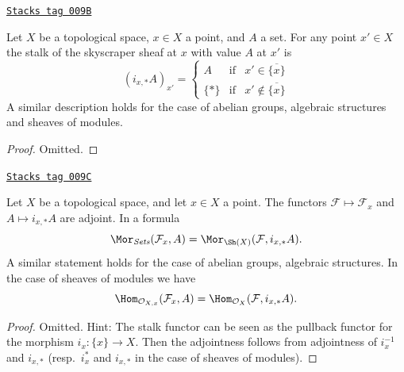 \begin{lemma}
\label{sheaves-lemma-skyscraper-stalks}
\href{https://stacks.math.columbia.edu/tag/009B}{\texttt{Stacks tag 009B}}

Let $X$ be a topological space, $x \in X$ a point, and
$A$ a set. For any point $x' \in X$ the stalk of the
skyscraper sheaf at $x$ with value $A$ at $x'$ is
$$
(i_{x, *}A)_{x'} =
\left\{
\begin{matrix}
A & \text{if} & x' \in \overline{\{x\}} \\
\{*\} & \text{if} & x' \not\in \overline{\{x\}}
\end{matrix}
\right.
$$
A similar description holds for the case of
abelian groups, algebraic structures and
sheaves of modules.
\end{lemma}

\begin{proof}
Omitted.
\end{proof}

\begin{lemma}
\label{sheaves-lemma-stalk-skyscraper-adjoint}
\href{https://stacks.math.columbia.edu/tag/009C}{\texttt{Stacks tag 009C}}

Let $X$ be a topological space, and let $x \in X$ a point.
The functors $\mathcal{F} \mapsto \mathcal{F}_x$ and
$A \mapsto i_{x, *}A$ are adjoint. In a formula
$$
\Mor_{\textit{Sets}}(\mathcal{F}_x, A)
=
\Mor_{\Sh(X)}(\mathcal{F}, i_{x, *}A).
$$
A similar statement holds for the case of
abelian groups, algebraic structures. In the case of
sheaves of modules we have
$$
\Hom_{\mathcal{O}_{X, x}}(\mathcal{F}_x, A)
=
\Hom_{\mathcal{O}_X}(\mathcal{F}, i_{x, *}A).
$$
\end{lemma}

\begin{proof}
Omitted. Hint: The stalk functor can be
seen as the pullback functor for the morphism $i_x : \{x\} \to X$.
Then the adjointness follows from adjointness of
$i_x^{-1}$ and $i_{x, *}$ (resp.\ $i_x^*$ and $i_{x, *}$
in the case of sheaves of modules).
\end{proof}

